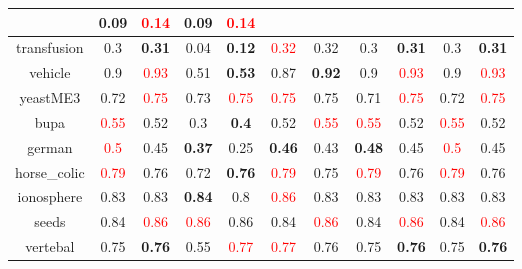 \documentclass{article}%
\begin{document}
\begin{tabular}{c|cccccccccc}
{}&0.09&\textcolor{red}{ 
0.14
}&0.09&\textcolor{red}{ 
0.14
}\\%
\hline%
transfusion&0.3&\textbf{0.31}&0.04&\textbf{0.12}&\textcolor{red}{ 
0.32
}&0.32&0.3&\textbf{0.31}&0.3&\textbf{0.31}\\%
\hline%
vehicle&0.9&\textcolor{red}{ 
0.93
}&0.51&\textbf{0.53}&0.87&\textbf{0.92}&0.9&\textcolor{red}{ 
0.93
}&0.9&\textcolor{red}{ 
0.93
}\\%
\hline%
yeastME3&0.72&\textcolor{red}{ 
0.75
}&0.73&\textcolor{red}{ 
0.75
}&\textcolor{red}{ 
0.75
}&0.75&0.71&\textcolor{red}{ 
0.75
}&0.72&\textcolor{red}{ 
0.75
}\\%
\hline%
bupa&\textcolor{red}{ 
0.55
}&0.52&0.3&\textbf{0.4}&0.52&\textcolor{red}{ 
0.55
}&\textcolor{red}{ 
0.55
}&0.52&\textcolor{red}{ 
0.55
}&0.52\\%
\hline%
german&\textcolor{red}{ 
0.5
}&0.45&\textbf{0.37}&0.25&\textbf{0.46}&0.43&\textbf{0.48}&0.45&\textcolor{red}{ 
0.5
}&0.45\\%
\hline%
horse\_colic&\textcolor{red}{ 
0.79
}&0.76&0.72&\textbf{0.76}&\textcolor{red}{ 
0.79
}&0.75&\textcolor{red}{ 
0.79
}&0.76&\textcolor{red}{ 
0.79
}&0.76\\%
\hline%
ionosphere&0.83&0.83&\textbf{0.84}&0.8&\textcolor{red}{ 
0.86
}&0.83&0.83&0.83&0.83&0.83\\%
\hline%
seeds&0.84&\textcolor{red}{ 
0.86
}&\textcolor{red}{ 
0.86
}&0.86&0.84&\textcolor{red}{ 
0.86
}&0.84&\textcolor{red}{ 
0.86
}&0.84&\textcolor{red}{ 
0.86
}\\%
\hline%
vertebal&0.75&\textbf{0.76}&0.55&\textcolor{red}{ 
0.77
}&\textcolor{red}{ 
0.77
}&0.76&0.75&\textbf{0.76}&0.75&\textbf{0.76}\\%
\hline%
\end{tabular}

%
\end{document}
